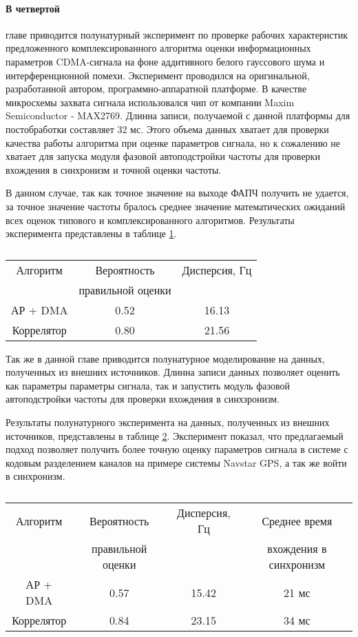 \paragraph{В четвертой} главе приводится полунатурный эксперимент по проверке рабочих характеристик предложенного комплексированного алгоритма
оценки информационных параметров CDMA-сигнала на фоне аддитивного белого гауссового шума и интерференционной помехи.
Эксперимент проводился на оригинальной, разработанной автором, программно-аппаратной платформе.
В качестве микросхемы захвата сигнала использовался чип от компании Maxim Semiconductor - MAX2769. Длинна записи, получаемой
с данной платформы для постобработки составляет 32 мс. Этого объема данных хватает для проверки качества работы алгоритма при оценке
параметров сигнала, но к сожалению не хватает для запуска модуля фазовой автоподстройки частоты для проверки вхождения в синхронизм и точной оценки частоты.

В данном случае, так как точное значение на выходе ФАПЧ получить не удается, за точное значение частоты бралось среднее значение математических
ожиданий всех оценок типового и комплексированного алгоритмов. Результаты эксперимента представлены в таблице \ref{tbl:16MHz}.

{\centering
\begin{longtable}{ | c | c | c |}
	\caption{}\label{tbl:16MHz} \\
	\hline
	Алгоритм	& Вероятность	& Дисперсия, Гц \\
			& правильной оценки&		\\ \hline
	АР + DMA	& 0.52 & 16.13	\\ \hline
	Коррелятор 	& 0.80 &  21.56 \\ \hline
\end{longtable}}

Так же в данной главе приводится полунатурное моделирование на данных, полученных из внешних источников. Длинна записи данных
позволяет оценить как параметры параметры сигнала, так и запустить модуль фазовой автоподстройки частоты для проверки вхождения в синхзронизм.

Результаты полунатурного эксперимента на данных, полученных из внешних источников, представлены в таблице \ref{tbl:5MHz}.
Эксперимент показал, что предлагаемый подход позволяет получить более точную оценку параметров
сигнала в системе с кодовым разделением каналов на примере системы Navstar GPS, а так же войти в синхронизм.

{\centering
\begin{longtable}{ | c | c | c | c |}
	\caption{}\label{tbl:5MHz} \\
	\hline
	Алгоритм	& Вероятность	& Дисперсия, Гц & Среднее время \\
			& правильной оценки&		& вхождения в синхронизм\\ \hline
	АР + DMA	& 0.57 		& 15.42		& 21 мс \\ \hline
	Коррелятор 	& 0.84 		& 23.15 	& 34 мс \\ \hline
\end{longtable}}

